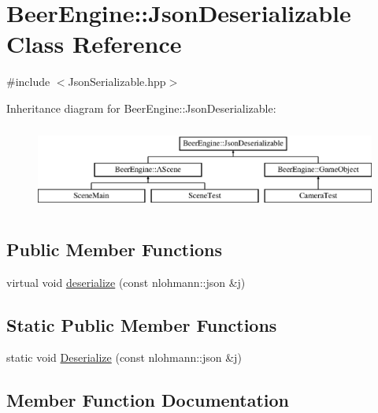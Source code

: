 \hypertarget{class_beer_engine_1_1_json_deserializable}{}\section{Beer\+Engine\+:\+:Json\+Deserializable Class Reference}
\label{class_beer_engine_1_1_json_deserializable}


{\ttfamily \#include $<$Json\+Serializable.\+hpp$>$}

Inheritance diagram for Beer\+Engine\+:\+:Json\+Deserializable\+:\begin{figure}[H]
\begin{center}
\leavevmode
\includegraphics[height=2.814070cm]{class_beer_engine_1_1_json_deserializable}
\end{center}
\end{figure}
\subsection*{Public Member Functions}
\begin{DoxyCompactItemize}
\item 
virtual void \mbox{\hyperlink{class_beer_engine_1_1_json_deserializable_ae1ce96bc441e544e7339641d80925726}{deserialize}} (const nlohmann\+::json \&j)
\end{DoxyCompactItemize}
\subsection*{Static Public Member Functions}
\begin{DoxyCompactItemize}
\item 
static void \mbox{\hyperlink{class_beer_engine_1_1_json_deserializable_af4c5582f75eb96988c5d4ff546218e1e}{Deserialize}} (const nlohmann\+::json \&j)
\end{DoxyCompactItemize}


\subsection{Member Function Documentation}
\mbox{\label{class_beer_engine_1_1_json_deserializable_ae1ce96bc441e544e7339641d80925726}} 
